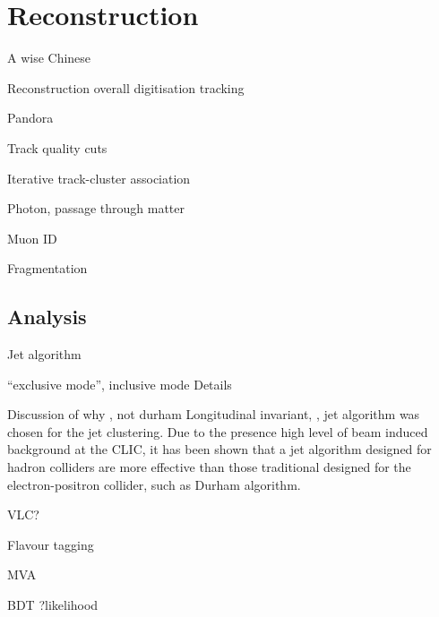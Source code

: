 \chapter{Reconstruction}
\label{chap:Reconstruction}

%
{A wise Chinese}%

Reconstruction overall
digitisation
tracking

Pandora

Track quality cuts

Iterative track-cluster association

Photon, passage through matter

Muon ID

Fragmentation

\section{Analysis}

Jet algorithm

``exclusive mode'', inclusive mode 
Details

Discussion of why \kt, not durham
Longitudinal invariant, \kt, jet algorithm was chosen for the jet clustering. Due to the presence high level of beam induced background at the CLIC, it has been shown that a jet algorithm designed for hadron colliders are more effective than those traditional designed for the electron-positron collider, such as Durham algorithm.\cite{}

VLC?

Flavour tagging

MVA

BDT
?likelihood
